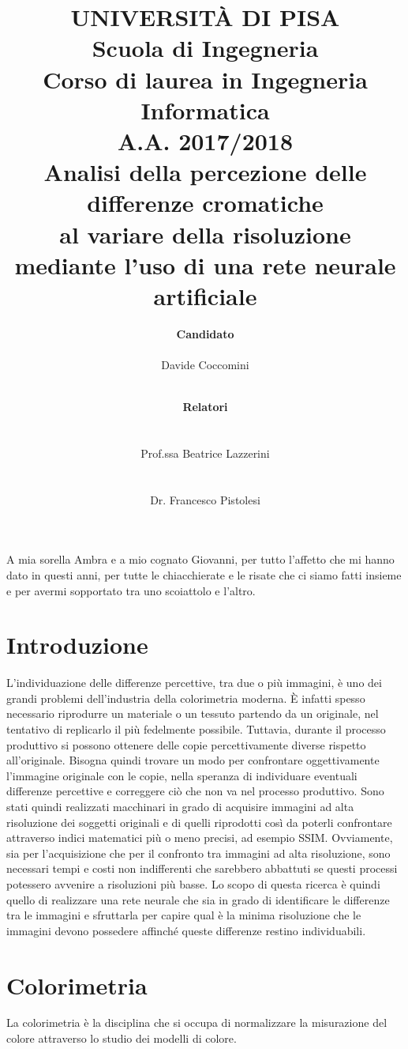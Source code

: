 \documentclass[a4paper,11pt]{article}
\author{
        \rule{0in}{0pt}\textbf{\Large Candidato} \\
        \rule{0in}{0pt}Davide Coccomini \\
        \and
        \rule{1.2in}{0pt}\textbf{\Large Relatori}\\
        \rule{1.2in}{0pt}Prof.ssa Beatrice Lazzerini\\
        \rule{1.2in}{0pt}Dr. Francesco Pistolesi 
    }
\title{\textbf{UNIVERSITÀ DI PISA} \\[0.4in]
    Scuola di Ingegneria \\
    Corso di laurea in Ingegneria Informatica \\
    A.A. 2017/2018\\[0.7in]
    Analisi della percezione delle differenze cromatiche\\
    al variare della risoluzione mediante l'uso di una rete neurale artificiale\\[0.8in]}
\date{}
\begin{document}
    \pagestyle{fancy}
    \fancyhf{}
    \fancyhead[L]{\rightmark}
    
    \fancyfoot{}
    \fancyfoot[LE,RO]{\thepage}    
    \renewcommand{\footrulewidth}{0.4pt}
    \maketitle
    \newpage
    
    \vspace*{\fill}
    A mia sorella Ambra e a mio cognato Giovanni, per tutto l’affetto che mi hanno dato in questi anni, per tutte le chiacchierate e le risate che ci siamo fatti insieme e per avermi sopportato tra uno scoiattolo e l’altro.
    \vspace*{\fill}
    \newpage
        \tableofcontents
        \newpage
        \section{Introduzione}
        L'individuazione delle differenze percettive, tra due o più immagini, è uno dei grandi problemi dell'industria della colorimetria moderna. È infatti spesso necessario riprodurre un materiale o un tessuto partendo da un originale, nel tentativo di replicarlo il più fedelmente possibile. 
        Tuttavia, durante il processo produttivo si possono ottenere delle copie percettivamente diverse rispetto all'originale.
        Bisogna quindi trovare un modo per confrontare oggettivamente l'immagine originale con le copie, nella speranza di individuare eventuali differenze percettive e correggere ciò che non va nel processo produttivo. 
        Sono stati quindi realizzati macchinari in grado di acquisire immagini ad alta risoluzione dei soggetti originali e di quelli riprodotti così da poterli confrontare attraverso indici matematici più o meno precisi, ad esempio SSIM.
        Ovviamente, sia per l'acquisizione che per il confronto tra immagini ad alta risoluzione, sono necessari tempi e costi non indifferenti che sarebbero abbattuti se questi processi potessero avvenire a risoluzioni più basse.
        Lo scopo di questa ricerca è quindi quello di realizzare una rete neurale che sia in grado di identificare le differenze tra le immagini e sfruttarla per capire qual è la minima risoluzione che le immagini devono possedere affinché queste differenze restino individuabili.
    
        \newpage
        \section{Colorimetria}
        La colorimetria è la disciplina che si occupa di normalizzare la misurazione del colore attraverso lo studio dei modelli di colore.
\end{document}
